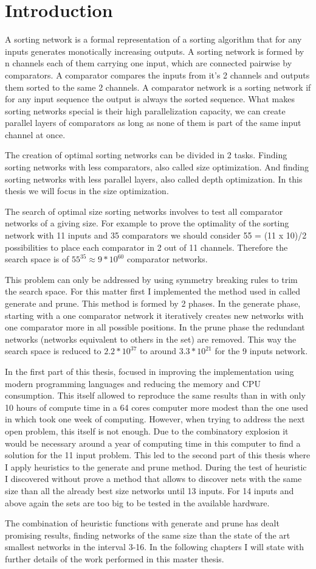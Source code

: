 \documentclass[../main.tex]{subfiles}
\begin{document}
\section{Introduction}
A sorting network is a formal representation of a sorting algorithm that for any inputs generates
monotically increasing outputs. A sorting network is formed by n channels each of them carrying one input,
which are connected pairwise by comparators. A comparator compares the inputs from it's 2 channels and 
outputs them sorted to the same 2 channels. A comparator network is a sorting network if for any 
input sequence the output is always the sorted sequence. What makes sorting networks special is their
high parallelization capacity, we can create parallel layers of comparators as long as none of them is part of
the same input channel at once.

The creation of optimal sorting networks can be divided in 2 tasks. Finding sorting networks with less comparators,
also called size optimization. And finding sorting networks with less parallel layers, also called depth optimization.
In this thesis we will focus in the size optimization.

The search of optimal size sorting networks involves to test all comparator networks of a giving size. 
For example to prove the optimality of the sorting network
with 11 inputs and 35 comparators we should consider 55 = (11 x 10)/2 possibilities to place each comparator in 2 out of 11 channels. Therefore the search space is of $55^{35} \approx 9 * 10^{60}$ comparator networks. 

This problem can only be addressed by using symmetry breaking rules to trim the search space. For this matter first I implemented the method used in \cite{sortingnineinputs} called generate and prune. This method is formed by 2 phases.
In the generate phase, starting with a one comparator network it iteratively creates new networks with one comparator more in all possible positions. In the prune phase the redundant networks (networks equivalent to others in the set) are removed. This way the search space is reduced to $2.2 * 10^{37}$ to around $3.3 * 10^{21}$ for the 9 inputs network.

In the first part of this thesis, focused in improving the implementation using modern programming languages and reducing the memory and CPU consumption. This itself allowed to reproduce the same results than in \cite{sortingnineinputs} with only 10 hours of compute time in a 64 cores computer more modest than the one used in \cite{sortingnineinputs} which took one week of computing. However, when trying to address the next open problem, this itself is not enough. Due to the combinatory explosion it would be necessary around a year of computing time in this computer to find a solution for the 11 input problem. This led to the second part of this thesis where I apply heuristics to the generate and prune method. During the test of heuristic I discovered without prove a method that allows to discover nets with the same size than all the already best size networks until 13 inputs. For 14 inputs and above again the sets are too big to be tested in the available hardware.

The combination of heuristic functions with generate and prune has dealt promising results, finding networks of the same size than the state of the art smallest networks in the interval 3-16. In the following chapters I will state with further details of the work performed in this master thesis.
\end{document}
